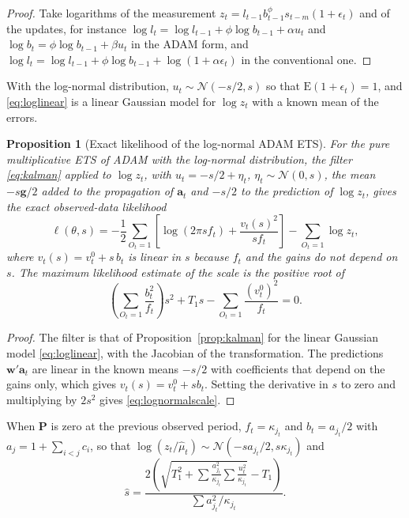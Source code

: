 \documentclass[11pt,a4paper]{article}
\newcommand{\vect}[1]{\mathbf{#1}}
\newcommand{\E}{\mathrm{E}}
\newtheorem{proposition}{Proposition}
\theoremstyle{remark}
\begin{document}
\begin{proof}
Take logarithms of the measurement $z_t = l_{t-1}b_{t-1}^{\phi}s_{t-m}(1+\epsilon_t)$ and of the
updates, for instance $\log l_t = \log l_{t-1} + \phi\log b_{t-1} + \alpha u_t$ and
$\log b_t = \phi\log b_{t-1} + \beta u_t$ in the ADAM form, and
$\log l_t = \log l_{t-1} + \phi\log b_{t-1} + \log(1+\alpha\epsilon_t)$ in the conventional one.
\end{proof}

With the log-normal distribution, $u_t\sim\mathcal N(-s/2, s)$ so that $\E(1+\epsilon_t) = 1$, and
\eqref{eq:loglinear} is a linear Gaussian model for $\log z_t$ with a known mean of the errors.

\begin{proposition}[Exact likelihood of the log-normal ADAM ETS]
\label{prop:lognormal}
For the pure multiplicative ETS of ADAM with the log-normal distribution, the filter
\eqref{eq:kalman} applied to $\log z_t$, with $u_t = -s/2 + \eta_t$, $\eta_t\sim\mathcal N(0,s)$,
the mean $-s\vect g/2$ added to the propagation of $\vect a_t$ and $-s/2$ to the prediction of
$\log z_t$, gives the exact observed-data likelihood
\[
\ell(\theta, s) = -\frac12\sum_{O_t=1}\left[\log(2\pi s f_t) + \frac{v_t(s)^2}{s f_t}\right]
- \sum_{O_t=1}\log z_t ,
\]
where $v_t(s) = v_t^0 + s\,b_t$ is linear in $s$ because $f_t$ and the gains do not depend on $s$.
The maximum likelihood estimate of the scale is the positive root of
\begin{equation}
\left(\sum_{O_t=1}\frac{b_t^2}{f_t}\right)s^2 + T_1 s - \sum_{O_t=1}\frac{(v_t^0)^2}{f_t} = 0 .
\label{eq:lognormalscale}
\end{equation}
\end{proposition}

\begin{proof}
The filter is that of Proposition~\ref{prop:kalman} for the linear Gaussian model
\eqref{eq:loglinear}, with the Jacobian of the transformation. The predictions $\vect w'\vect a_t$
are linear in the known means $-s/2$ with coefficients that depend on the gains only, which gives
$v_t(s) = v_t^0 + s b_t$. Setting the derivative in $s$ to zero and multiplying by $2s^2$ gives
\eqref{eq:lognormalscale}.
\end{proof}

When $\vect P$ is zero at the previous observed period, $f_t = \kappa_{j_t}$ and
$b_t = a_{j_t}/2$ with $a_j = 1 + \sum_{i<j}c_i$, so that
$\log(z_t/\hat\mu_t)\sim\mathcal N(-s a_{j_t}/2, s\kappa_{j_t})$ and
\begin{equation}
\hat s = \frac{2\left(\sqrt{T_1^2 + \sum\frac{a_{j_t}^2}{\kappa_{j_t}}\sum\frac{u_t^2}{\kappa_{j_t}}}
- T_1\right)}{\sum a_{j_t}^2/\kappa_{j_t}} .
\label{eq:lognormalscalereset}
\end{equation}
\end{document}
